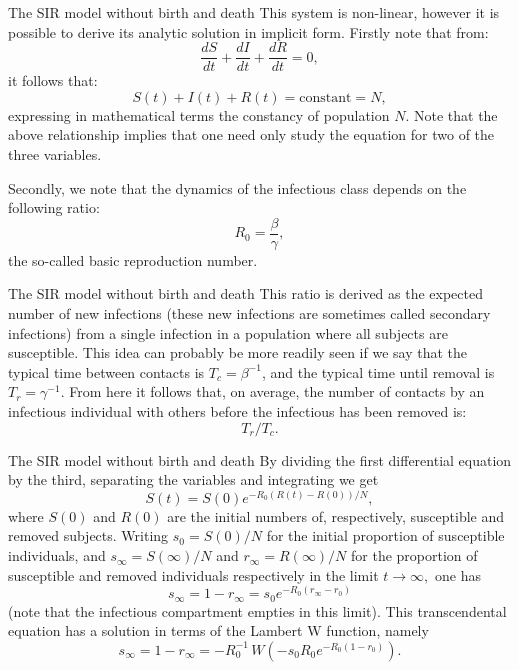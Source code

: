 \documentclass[
  notheorems,
  aspectratio=54,
]{beamer}
\begin{document}
\begin{frame}{The SIR model without birth and death}
This system is non-linear, however it is possible to derive its analytic solution in implicit form. Firstly note that from:
$${\displaystyle {\frac {dS}{dt}}+{\frac {dI}{dt}}+{\frac {dR}{dt}}=0,}$$
it follows that:
$${\displaystyle S(t)+I(t)+R(t)={\text{constant}}=N,}$$
expressing in mathematical terms the constancy of population 
${\displaystyle N}$. Note that the above relationship implies that one need only study the equation for two of the three variables.

Secondly, we note that the dynamics of the infectious class depends on the following ratio:
$${\displaystyle R_{0}={\frac {\beta }{\gamma }},}$$
the so-called basic reproduction number.
\end{frame}

\begin{frame}{The SIR model without birth and death}
  This ratio is derived as the expected number of new infections (these new infections are sometimes called secondary infections) from a single infection in a population where all subjects are susceptible. This idea can probably be more readily seen if we say that the typical time between contacts is 
${\displaystyle T_{c}=\beta ^{-1}}$, and the typical time until removal is 
${\displaystyle T_{r}=\gamma ^{-1}}$. From here it follows that, on average, the number of contacts by an infectious individual with others before the infectious has been removed is: 
$${\displaystyle T_{r}/T_{c}.}$$

\end{frame}

\begin{frame}{The SIR model without birth and death}
By dividing the first differential equation by the third, separating the variables and integrating we get
$${\displaystyle S(t)=S(0)e^{-R_{0}(R(t)-R(0))/N},}$$
where 
${\displaystyle S(0)}$ and 
${\displaystyle R(0)}$ are the initial numbers of, respectively, susceptible and removed subjects. Writing 
${\displaystyle s_{0}=S(0)/N}$ for the initial proportion of susceptible individuals, and 
${\displaystyle s_{\infty }=S(\infty )/N}$ and 
${\displaystyle r_{\infty }=R(\infty )/N}$ for the proportion of susceptible and removed individuals respectively in the limit 
${\displaystyle t\to \infty ,}$ one has
$${\displaystyle s_{\infty }=1-r_{\infty }=s_{0}e^{-R_{0}(r_{\infty }-r_{0})}}$$
(note that the infectious compartment empties in this limit). This transcendental equation has a solution in terms of the Lambert W function, namely
$${\displaystyle s_{\infty }=1-r_{\infty }=-R_{0}^{-1}\,W(-s_{0}R_{0}e^{-R_{0}(1-r_{0})}).}$$
\end{frame}
\end{document}
